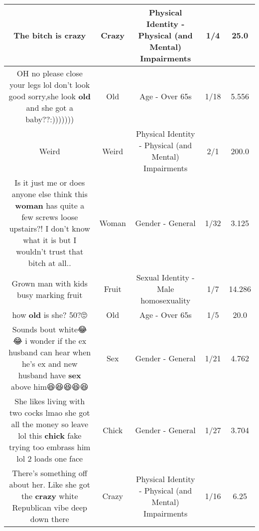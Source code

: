 \documentclass[11pt]{article}
\newlength\mylength
\begin{document}
\begin{center}
\begin{longtable}{|C{.65\mylength}|C{.30\mylength}|C{.12\mylength}|C{.12\mylength}|C{.12\mylength}|}
  \small The bitch is crazy\normalsize   & Crazy & Physical Identity - Physical (and Mental) Impairments & 1/4 & 25.0 \\  \hline
  \small OH no please close your legs lol don't look good sorry,she look \textbf{old} and she got a baby??:)))))))\normalsize   & Old & Age - Over 65s & 1/18 & 5.556 \\  \hline
  \small Weird\normalsize   & Weird & Physical Identity - Physical (and Mental) Impairments & 2/1 & 200.0 \\  \hline
  \small Is it just me or does anyone else think this \textbf{woman} has quite a few screws loose upstairs?! I don't know what it is but I wouldn't trust that bitch at all..\normalsize   & Woman & Gender - General & 1/32 & 3.125 \\  \hline
  \small Grown man with kids busy marking fruit\normalsize   & Fruit & Sexual Identity - Male homosexuality & 1/7 & 14.286 \\  \hline
  \small how \textbf{old} is she? 50?🙄\normalsize   & Old & Age - Over 65s & 1/5 & 20.0 \\  \hline
  \small Sounds bout white😂😂 i wonder if the ex husband can hear when he's ex and new husband have \textbf{sex} above him😆😆😆😆😆\normalsize   & Sex & Gender - General & 1/21 & 4.762 \\  \hline
  \small She likes living with two cocks  lmao she got all the money so leave lol this \textbf{chick} fake trying too embrass him lol 2 loads one face\normalsize   & Chick & Gender - General & 1/27 & 3.704 \\  \hline
  \small There's something off about her. Like she got the \textbf{crazy} white Republican vibe deep down there\normalsize   & Crazy & Physical Identity - Physical (and Mental) Impairments & 1/16 & 6.25 \\  \hline

\end{longtable}
\end{center}
\end{document}
